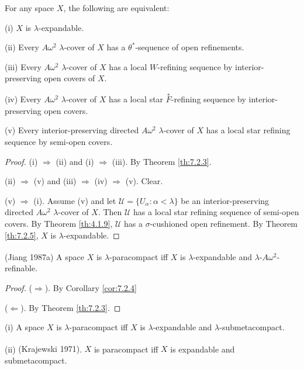 \documentclass[jisng7iii.tex]{subfiles}
\begin{document}
{\theorem{} \label{th:7.2.6}
For any space $X$, the following are equivalent:

\textup{(i)}  $X$ is $\lambda$-expandable.

\textup{(ii)}   Every $A\omega^2$ $\lambda$-cover of  $X$ has a 
$\theta^*$-sequence of open refinements.

\textup{(iii)}   Every $A\omega^2$ $\lambda$-cover of  $X$ has a local $W$-refining sequence by interior-preserving open covers of  $X$.

\textup{(iv)}   Every $A\omega^2$ $\lambda$-cover of  $X$ has 
a local star $\overset{*}{F}$-refining sequence by  interior-preserving open covers.

\textup{(v)}   Every interior-preserving directed $A\omega^2$ 
$\lambda$-cover of  $X$ has a local star refining sequence by semi-open covers.
}

\begin{proof}
 (i) $\Rightarrow$ (ii) and (i) $\Rightarrow$ (iii). By Theorem \ref{th:7.2.3}. %

(ii) $\Rightarrow$ (v) and (iii) $\Rightarrow$ (iv) $\Rightarrow$ (v). Clear.


(v) $\Rightarrow$ (i).  Assume (v) and let $\mathscr{U} = \{ U_\alpha: \alpha < \lambda\}$ be an 
interior-preserving directed $A\omega^2$ $\lambda$-cover of  $X$. 
Then $\mathscr{U}$ has a local star refining sequence of semi-open covers. 
By Theorem \ref{th:4.1.9}, $\mathscr{U}$ has a $\sigma$-cushioned open refinement. 
By Theorem \ref{th:7.2.5},  $X$ is $\lambda$-expandable.
\end{proof}


{\theorem{} \label{th:7.2.7}
\textup{(\hstretch{1.8}{[}Jiang 1987a\hstretch{1.8}{]}\textsuperscript{\cite{Jiang1987a}})}
A space $X$ is $\lambda$-paracompact iff  $X$ is $\lambda$-expandable and
 $\lambda$-$A\omega^2$-refinable.
}

\begin{proof}
($\Rightarrow$). By Corollary \ref{cor:7.2.4} %

($\Leftarrow$). By Theorem \ref{th:7.2.3}. %
\end{proof}

{\corollary{} \label{cor:7.2.8}
\textup{(i)}  A space $X$ is $\lambda$-paracompact iff  $X$ is $\lambda$-expandable  
and $\lambda$-submetacompact.

\textup{(ii)}  \textup{(\hstretch{1.8}{[}Krajewski 1971\hstretch{1.8}{]}\textsuperscript{\cite{Krajewski}})}.   
$X$ is paracompact iff  $X$ is expandable and submetacompact. \hfill\qedsymbol
}
\end{document}
